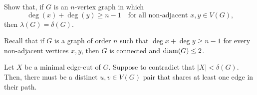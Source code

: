 \question Show that, if $G$ is an $n$-vertex graph in which 
\[
  \deg(x)+\deg(y) \geq n-1 \quad
  \text{for all non-adjacent $x, y \in V(G)$,} 
\]
then $\lambda(G)=\delta(G)$.

\begin{solution}
  Recall that if \(G\) is a graph of order \(n\) such
  that \(\deg x + \deg y \geq n-1\) for every non-adjacent vertices \(x, y\),
  then \(G\) is connected and \(\operatorname{diam}(G) \leq 2\).

  Let \(X\) be a minimal edge-cut of \(G\). Suppose to contradict
  that \(|X| < \delta(G)\). Then, there must be a distinct \(u,
  v \in V(G)\) pair that shares at least one edge in their path.
  

\end{solution}
